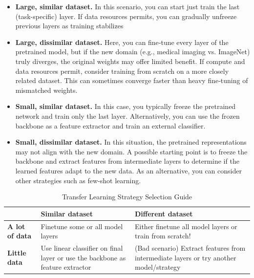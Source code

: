 \begin{itemize}
    \item \textbf{Large, similar dataset.} In this scenario, you can start just train the last (task-specific) layer. If data resources permits, you can gradually unfreeze previous layers as training stabilizes
   
    \item \textbf{Large, dissimilar dataset.} Here, you can fine‑tune every layer of the pretrained model, but if the new domain (e.g., medical imaging vs. ImageNet) truly diverges, the original weights may offer limited benefit. If compute and data resources permit, consider training from scratch on a more closely related dataset. This can sometimes converge faster than heavy fine‑tuning of mismatched weights. 

    \item \textbf{Small, similar dataset.} In this case, you typically freeze the pretrained network and train only the last layer. Alternatively, you can use the frozen backbone as a feature extractor and train an external classifier.

    \item \textbf{Small, dissimilar dataset.} In this situation, the pretrained representations may not align with the new domain. A possible starting point is to freeze the backbone and extract features from intermediate layers to determine if the learned features adapt to the new data. As an alternative, you can consider other strategies such as few-shot learning.

\end{itemize}

\begin{table}[h]
\centering
\setlength{\extrarowheight}{5pt}
\label{tab:transfer_learning}
        \begin{tabular}{|>{\raggedright\arraybackslash}m{1.3cm}
            |>{\raggedright\arraybackslash}m{4.5cm}
            |>{\raggedright\arraybackslash}m{4.5cm}|}
            \hline
                & \textbf{Similar dataset} & \textbf{Different dataset} \\
            \hline
                \textbf{A lot of data} & Finetune some or all model layers & Either finetune all model layers or train from scratch! \\
            \hline
                \textbf{Little data} & Use linear classifier on final layer or use the backbone as feature extractor & (Bad scenario) Extract features from intermediate layers or try another model/strategy \\          
            \hline
        \end{tabular}
    
\caption{Transfer Learning Strategy Selection Guide}
\end{table}

